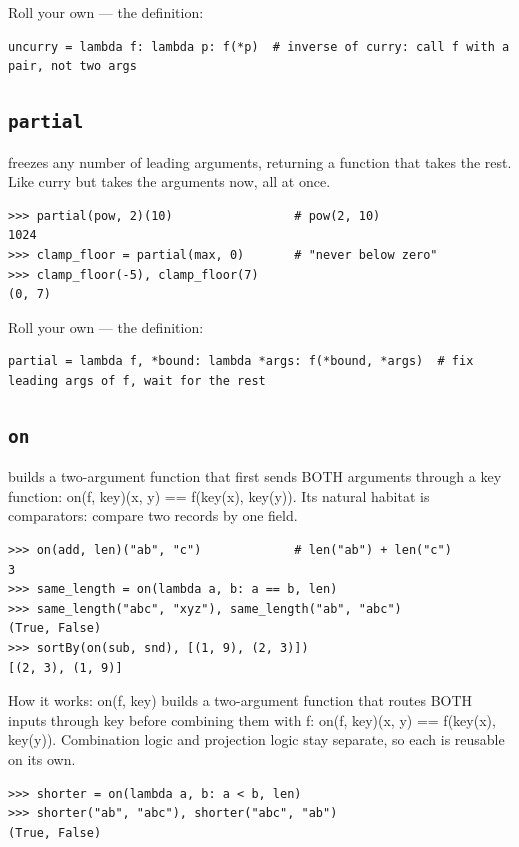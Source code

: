 \documentclass[10pt,letterpaper]{book}
\begin{document}
Roll your own --- the definition:

\begin{lstlisting}[style=ex]
uncurry = lambda f: lambda p: f(*p)  # inverse of curry: call f with a pair, not two args
\end{lstlisting}
\subsection{\texttt{partial}}\label{def:partial}
freezes any number of leading arguments, returning a function that takes the rest. Like curry but takes the arguments now, all at once.
\begin{lstlisting}[style=ex]
>>> partial(pow, 2)(10)                 # pow(2, 10)
1024
>>> clamp_floor = partial(max, 0)       # "never below zero"
>>> clamp_floor(-5), clamp_floor(7)
(0, 7)
\end{lstlisting}

Roll your own --- the definition:

\begin{lstlisting}[style=ex]
partial = lambda f, *bound: lambda *args: f(*bound, *args)  # fix leading args of f, wait for the rest
\end{lstlisting}
\subsection{\texttt{on}}\label{def:on}
builds a two-argument function that first sends BOTH arguments through a key function: on(f, key)(x, y) == f(key(x), key(y)). Its natural habitat is comparators: compare two records by one field.
\begin{lstlisting}[style=ex]
>>> on(add, len)("ab", "c")             # len("ab") + len("c")
3
>>> same_length = on(lambda a, b: a == b, len)
>>> same_length("abc", "xyz"), same_length("ab", "abc")
(True, False)
>>> sortBy(on(sub, snd), [(1, 9), (2, 3)])
[(2, 3), (1, 9)]
\end{lstlisting}

How it works: on(f, key) builds a two-argument function that routes BOTH inputs through key before combining them with f: on(f, key)(x, y) == f(key(x), key(y)). Combination logic and projection logic stay separate, so each is reusable on its own.

\begin{lstlisting}[style=ex]
>>> shorter = on(lambda a, b: a < b, len)
>>> shorter("ab", "abc"), shorter("abc", "ab")
(True, False)
\end{lstlisting}
\end{document}
